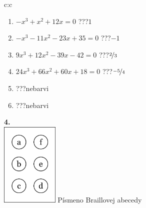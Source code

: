\documentclass[10pt]{report}
\begin{document}
\begin{tabular}{c:c}
\begin{minipage}[c][104.5mm][t]{0.5\linewidth}
\begin{center}
\begin{minipage}{0.79\linewidth}
\begin{center}
\begin{varwidth}{\linewidth}
\begin{enumerate}
\Large
\item $-x^3+x^2+12x=0$\quad \dotfill\; ???\;\dotfill \quad $1$
\item $-x^3-11x^2-23x+35=0$\quad \dotfill\; ???\;\dotfill \quad $-1$
\item $9x^3+12x^2-39x-42=0$\quad \dotfill\; ???\;\dotfill \quad $\nicefrac{2}{3}$
\item $24x^3+66x^2+60x+18=0$\quad \dotfill\; ???\;\dotfill \quad $\nicefrac{-5}{4}$
\item \quad \dotfill\; ???\;\dotfill \quad nebarvi
\item \quad \dotfill\; ???\;\dotfill \quad nebarvi
\end{enumerate}
\end{varwidth}
\end{center}
\end{minipage}
\begin{minipage}{0.20\linewidth}
\begin{center}
{\Huge\bfseries 4.} \\[2mm]
\includegraphics[height=40mm]{../images/braille.png}
{\small Písmeno Braillovej abecedy}
\end{center}
\end{minipage}
\end{center}
\end{minipage}
%
\end{tabular}
\newpage
\thispagestyle{empty}
\end{document}
